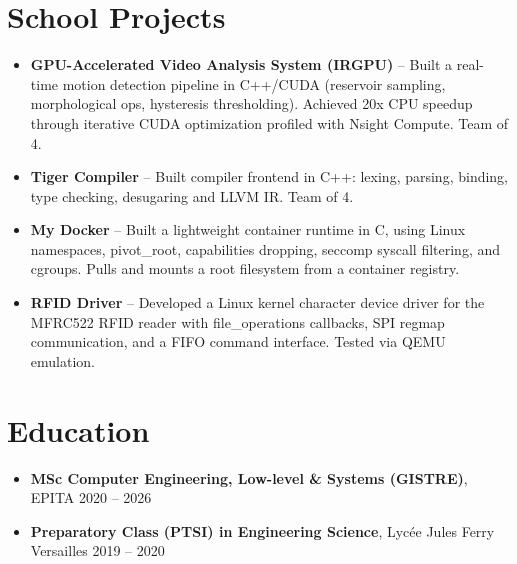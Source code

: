 \documentclass[9pt,a4paper]{article}
\begin{document}
\section*{School Projects}
\begin{tcolorbox}[mybox]
\begin{itemize}
\item \textbf{GPU-Accelerated Video Analysis System (IRGPU)} -- Built a real-time motion detection pipeline in C++/CUDA (reservoir sampling, morphological ops, hysteresis thresholding). Achieved 20x CPU speedup through iterative CUDA optimization profiled with Nsight Compute. Team of 4.

\item \textbf{Tiger Compiler} -- Built compiler frontend in C++: lexing, parsing, binding, type checking, desugaring and LLVM IR. Team of 4.

\item \textbf{My Docker} -- Built a lightweight container runtime in C, using Linux namespaces, pivot\_root, capabilities dropping, seccomp syscall filtering, and cgroups. Pulls and mounts a root filesystem from a container registry.

\item \textbf{RFID Driver} -- Developed a Linux kernel character device driver for the MFRC522 RFID reader with file\_operations callbacks, SPI regmap communication, and a FIFO command interface. Tested via QEMU emulation.
\end{itemize}
\end{tcolorbox}


\section*{Education}
\begin{tcolorbox}[mybox]
\begin{itemize}
\item \textbf{MSc Computer Engineering, Low-level \& Systems (GISTRE)}, EPITA {\small{\hfill 2020 – 2026}}

\item \textbf{Preparatory Class (PTSI) in Engineering Science}, Lycée Jules Ferry Versailles {\small{\hfill 2019 – 2020}}
\end{itemize}
\end{tcolorbox}
\end{document}
